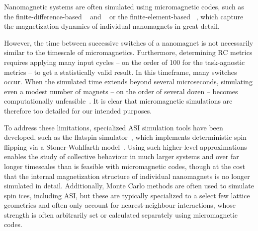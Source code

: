 Nanomagnetic systems are often simulated using micromagnetic codes, such as the finite-difference-based \mumax~\cite{mumax3} and \oommf~\cite{OOMMF} or the finite-element-based \nmag~\cite{Nmag}, which capture the magnetization dynamics of individual nanomagnets in great detail. \par
However, the time between successive switches of a nanomagnet is not necessarily similar to the timescale of micromagnetics. Furthermore, determining RC metrics requires applying many input cycles -- on the order of 100 for the task-agnostic metrics -- to get a statistically valid result. In this timeframe, many switches occur. When the simulated time extends beyond several microseconds, simulating even a modest number of magnets -- on the order of several dozen -- becomes computationally unfeasible~\cite{leo2021chiral}. It is clear that micromagnetic simulations are therefore too detailed for our intended purposes. \\\par

To address these limitations, specialized ASI simulation tools have been developed, such as the flatspin simulator~\cite{flatspin}, which implements deterministic spin flipping via a Stoner-Wohlfarth model~\cite{StonerWohlfarth2008}.
Using such higher-level approximations enables the study of collective behaviour in much larger systems and over far longer timescales than is feasible with micromagnetic codes, though at the cost that the internal magnetization structure of individual nanomagnets is no longer simulated in detail.
Additionally, Monte Carlo methods are often used to simulate spin ices, including ASI, but these are typically specialized to a select few lattice geometries and often only account for nearest-neighbour interactions, whose strength is often arbitrarily set or calculated separately using micromagnetic codes.~\cite{MeltingASI,sklenar2019field,gilbert2014emergent,zhang2013crystallites} \\\par %

